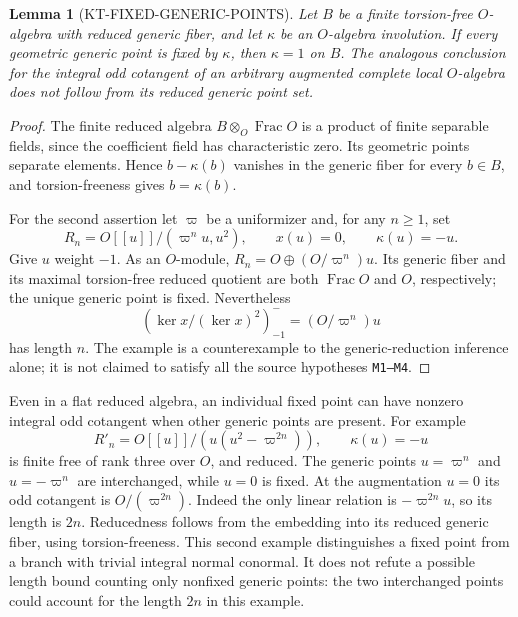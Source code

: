 \documentclass[11pt,a4paper]{article}
\newtheorem{lemma}[theorem]{Lemma}
\theoremstyle{definition}
\begin{document}
\begin{lemma}[KT-FIXED-GENERIC-POINTS]
Let $B$ be a finite torsion-free $O$-algebra with reduced generic
fiber, and let $\kappa$ be an $O$-algebra involution.  If every
geometric generic point is fixed by $\kappa$, then $\kappa=1$ on
$B$.  The analogous conclusion for the integral odd cotangent
of an arbitrary augmented complete local $O$-algebra does not
follow from its reduced generic point set.
\end{lemma}
\begin{proof}
The finite reduced algebra $B\otimes_O\operatorname{Frac}O$
is a product of finite separable fields, since the coefficient
field has characteristic zero.  Its geometric points separate
elements.  Hence $b-\kappa(b)$ vanishes in the generic fiber
for every $b\in B$, and torsion-freeness gives $b=\kappa(b)$.

For the second assertion let $\varpi$ be a uniformizer and, for
any $n\geq1$, set
\[
 R_n=O[[u]]/(\varpi^n u,u^2),\qquad
 x(u)=0,\qquad \kappa(u)=-u.                                \tag{KP.3}
\]
Give $u$ weight $-1$.  As an $O$-module,
$R_n=O\oplus (O/\varpi^n)u$.  Its generic fiber and its maximal
torsion-free reduced quotient are both $\operatorname{Frac}O$
and $O$, respectively; the unique generic point is fixed.
Nevertheless
\[
       (\ker x/(\ker x)^2)_{-1}^{-}
                    =(O/\varpi^n)u                           \tag{KP.4}
\]
has length $n$.  The example is a counterexample to the
generic-reduction inference alone; it is not claimed to satisfy
all the source hypotheses \texttt{M1--M4}.
\end{proof}

Even in a flat reduced algebra, an individual fixed point
can have nonzero integral odd cotangent when other generic
points are present.  For example
\[
 R'_n=O[[u]]/(u(u^2-\varpi^{2n})),\qquad \kappa(u)=-u          \tag{KP.5}
\]
is finite free of rank three over $O$, and reduced.  The generic
points $u=\varpi^n$ and $u=-\varpi^n$ are interchanged, while
$u=0$ is fixed.  At the augmentation $u=0$ its odd cotangent is
$O/(\varpi^{2n})$.  Indeed the only linear relation is
$-\varpi^{2n}u$, so its length is $2n$.  Reducedness follows
from the embedding into its reduced generic fiber, using
torsion-freeness.  This second example distinguishes a fixed
point from a branch with trivial integral normal conormal.
It does not refute a possible length bound counting only
nonfixed generic points: the two interchanged points could
account for the length $2n$ in this example.
\end{document}

